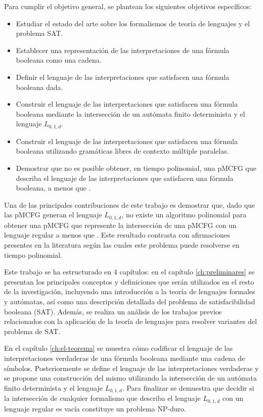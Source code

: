 Para cumplir el objetivo general, se plantean los siguientes objetivos específicos:

\begin{itemize}
    \item Estudiar el estado del arte sobre los formalismos de teoría de lenguajes y el problema SAT.
    \item Establecer una representación de las interpretaciones de una fórmula booleana como una cadena.
    \item Definir el lenguaje de las interpretaciones que satisfacen una fórmula booleana dada.
    \item Construir el lenguaje de las interpretaciones que satisfacen una fórmula booleana mediante la intersección de un autómata finito determinista y el lenguaje $L_{0, 1, d}$.
    \item Construir el lenguaje de las interpretaciones que satisfacen una fórmula booleana utilizando gramáticas libres de contexto múltiple paralelas.
    \item Demostrar que no es posible obtener, en tiempo polinomial, una pMCFG que describa el lenguaje de las interpretaciones que satisfacen una fórmula booleana, a menos que \pnp.
\end{itemize}

Una de las principales contribuciones de este trabajo es demostrar que, dado que las pMCFG generan el lenguaje $L_{0, 1, d}$, no existe un algoritmo polinomial para obtener una pMCFG que represente la intersección de una pMCFG con un lenguaje regular a menos que \pnp. Este resultado contrasta con afirmaciones presentes en la literatura según las cuales este problema puede resolverse en tiempo polinomial.

Este trabajo se ha estructurado en 4 capítulos: en el capítulo \ref{ch:preliminares} se presentan los principales conceptos y definiciones que serán utilizados en el resto de la investigación, incluyendo una introducción a la teoría de lenguajes formales y autómatas, así como una descripción detallada del problema de satisfacibilidad booleana (SAT). Además, se realiza un análisis de los trabajos previos relacionados con la aplicación de la teoría de lenguajes para resolver variantes del problema de SAT.

En el capítulo \ref{ch:el-teorema} se muestra cómo codificar el lenguaje de las interpretaciones verdaderas de una fórmula booleana mediante una cadena de símbolos. Posteriormente se define el lenguaje de las interpretaciones verdaderas y se propone una construcción del mismo utilizando la intersección de un autómata finito determinista y el lenguaje $L_{0, 1, d}$. Para finalizar se demuestra que decidir si la intersección de cualquier formalismo que describa el lenguaje $L_{0, 1, d}$ con un lenguaje regular es vacía constituye un problema NP-duro.

